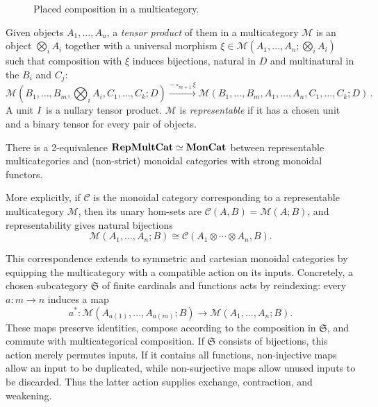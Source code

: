 \begin{figure}[t]
    \centering
    \caption{Placed composition in a multicategory.}
    \label{fig:composition_multicat}
\end{figure}
\begin{definition}
\label{def:multicat_tensor}
    Given objects $A_1, \ldots, A_n$, a \emph{tensor product} of them in a multicategory $\mathcal{M}$ is an object $\bigotimes_{i}A_{i}$ together with a universal morphism $\xi \in \mathcal{M}(A_1, \ldots, A_{n}; \bigotimes_{i}A_{i})$ such that composition with $\xi$ induces bijections, natural in $D$ and multinatural in the $B_i$ and $C_j$:
    \[
    \mathcal{M}(B_{1}, \ldots, B_{m}, \bigotimes_{i}A_{i}, C_{1}, \ldots, C_{k}; D)
    \xrightarrow{-\circ_{m+1}\xi}
    \mathcal{M}(B_1, \ldots, B_m, A_{1}, \ldots, A_{n}, C_{1}, \ldots, C_{k}; D)\,.
    \]
    A unit $I$ is a nullary tensor product.
    $\mathcal{M}$ is \emph{representable} if it has a chosen unit and a binary tensor for every pair of objects.
\end{definition}

\begin{proposition}
\label{prop:representable_multicategories}
    There is a 2-equivalence $\mathbf{RepMultCat} \simeq \mathbf{MonCat}$ between representable multicategories and (non-strict) monoidal categories with strong monoidal functors.
\end{proposition}

More explicitly, if $\mathcal{C}$ is the monoidal category corresponding to a representable multicategory $\mathcal{M}$, then its unary hom-sets are
$\mathcal{C}(A,B)=\mathcal{M}(A;B)$, and representability gives natural bijections
\[
\mathcal{M}(A_1,\ldots,A_n;B)
\cong
\mathcal{C}(A_1\otimes\cdots\otimes A_n,B).
\]


This correspondence extends to symmetric and cartesian monoidal categories by
equipping the multicategory with a compatible action on its inputs.
Concretely, a chosen subcategory $\mathfrak{S}$ of finite cardinals and functions acts by reindexing: every $a:m\to n$ induces a map
\[
a^* : \mathcal{M}(A_{a(1)},\ldots,A_{a(m)};B)
\longrightarrow \mathcal{M}(A_1,\ldots,A_n;B).
\]
These maps preserve identities, compose according to the composition in $\mathfrak{S}$, and commute with multicategorical composition.
If $\mathfrak{S}$ consists of bijections, this action merely permutes inputs.
If it contains all functions, non-injective maps allow an input to be duplicated, while non-surjective maps allow unused inputs to be discarded.
Thus the latter action supplies exchange, contraction, and weakening.

